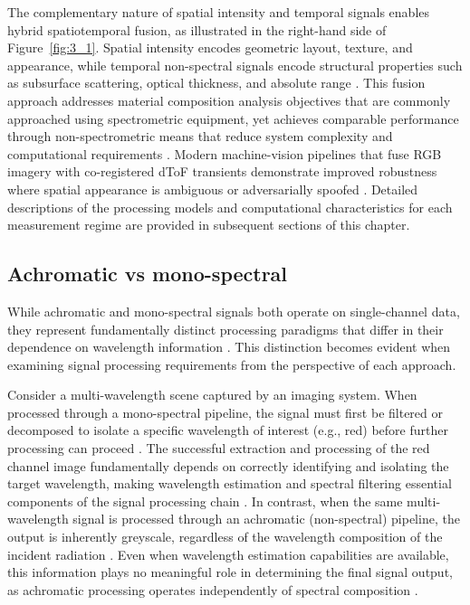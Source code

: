 \documentclass[12pt,a4paper,oneside]{report}
\begin{document}
The complementary nature of spatial intensity and temporal signals enables hybrid spatiotemporal fusion, as illustrated in the right-hand side of Figure~\ref{fig:3_1}. Spatial intensity encodes geometric layout, texture, and appearance, while temporal non-spectral signals encode structural properties such as subsurface scattering, optical thickness, and absolute range \cite{moramartin2021}. This fusion approach addresses material composition analysis objectives that are commonly approached using spectrometric equipment, yet achieves comparable performance through non-spectrometric means that reduce system complexity and computational requirements \cite{su2016,becker2023}. Modern machine-vision pipelines that fuse RGB imagery with co-registered dToF transients demonstrate improved robustness where spatial appearance is ambiguous or adversarially spoofed \cite{moramartin2021,yang2024}. Detailed descriptions of the processing models and computational characteristics for each measurement regime are provided in subsequent sections of this chapter.

\subsection{Achromatic vs mono-spectral}
\label{subsec:achromatic_vs_monospectral}

While achromatic and mono-spectral signals both operate on single-channel data, they represent fundamentally distinct processing paradigms that differ in their dependence on wavelength information \cite{elachi2021,schott2007}. This distinction becomes evident when examining signal processing requirements from the perspective of each approach.

Consider a multi-wavelength scene captured by an imaging system. When processed through a mono-spectral pipeline, the signal must first be filtered or decomposed to isolate a specific wavelength of interest (e.g., red) before further processing can proceed \cite{elachi2021}. The successful extraction and processing of the red channel image fundamentally depends on correctly identifying and isolating the target wavelength, making wavelength estimation and spectral filtering essential components of the signal processing chain \cite{schott2007}. In contrast, when the same multi-wavelength signal is processed through an achromatic (non-spectral) pipeline, the output is inherently greyscale, regardless of the wavelength composition of the incident radiation \cite{su2016}. Even when wavelength estimation capabilities are available, this information plays no meaningful role in determining the final signal output, as achromatic processing operates independently of spectral composition \cite{su2016,becker2023}.
\end{document}
